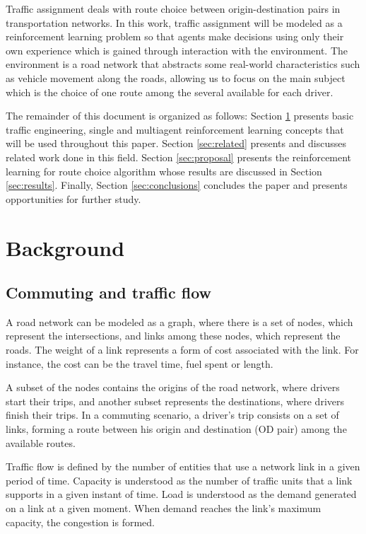 \documentclass[12pt]{llncs}
\begin{document}
Traffic assignment deals with route choice between origin-destination pairs in transportation networks. In this work, traffic assignment will be modeled as a reinforcement learning problem so that agents make decisions using only their own experience which is gained through interaction with the environment. The environment is a road network that abstracts some real-world characteristics such as vehicle movement along the roads, allowing us to focus on the main subject which is the choice of one route among the several available for each driver.

The remainder of this document is organized as follows: Section \ref{sec:concepts} presents basic traffic engineering, single and multiagent reinforcement learning concepts that will be used throughout this paper. Section \ref{sec:related} presents and discusses related work done in this field. Section \ref{sec:proposal} presents the reinforcement learning for route choice algorithm whose results are discussed in Section \ref{sec:results}. Finally, Section \ref{sec:conclusions} concludes the paper and presents opportunities for further study.

\section{Background}
\label{sec:concepts}
\subsection{Commuting and traffic flow}

A road network can be modeled as a graph, where there is a set of nodes, which represent the intersections, and links among these nodes, which represent the roads. The weight of a link represents a form of cost associated with the link. For instance, the cost can be the travel time, fuel spent or length.

A subset of the nodes contains the origins of the road network, where drivers start their trips, and another subset represents the destinations, where drivers finish their trips. In a commuting scenario, a driver's trip consists on a set of links, forming a route between his origin and destination (OD pair) among the available routes.

Traffic flow is defined by the number of entities that use a network link in a given period of time. Capacity is understood as the number of traffic units that a link supports in a given instant of time. Load is understood as the demand generated on a link at a given moment. When demand reaches the link's maximum capacity, the congestion is formed.
\end{document}
